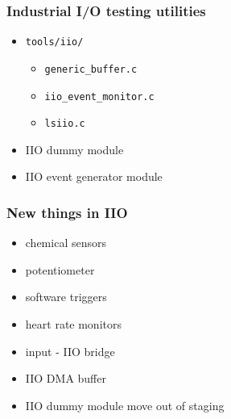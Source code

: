 \documentclass[aspectratio=169]{beamer}
\begin{document}
\begin{frame}
\frametitle{Industrial I/O testing utilities}
\begin{itemize}
    \item \texttt{tools/iio/}
    \begin{itemize}
        \item \texttt{generic\_buffer.c}
        \item \texttt{iio\_event\_monitor.c}
        \item \texttt{lsiio.c}
    \end{itemize}
    \item IIO dummy module
    \item IIO event generator module
\end{itemize}
\end{frame}




\begin{frame}
\frametitle{New things in IIO}
\begin{itemize}
    \item chemical sensors
    \item potentiometer
    \item software triggers
    \item heart rate monitors
    \item input - IIO bridge
    \item IIO DMA buffer
    \item IIO dummy module move out of staging
\end{itemize}
\end{frame}




\end{document}
